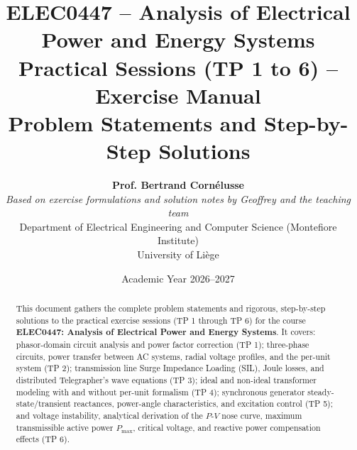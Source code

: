 \documentclass[11pt,a4paper]{article}
\title{
    \textbf{ELEC0447 -- Analysis of Electrical Power and Energy Systems} \\
    \vspace{0.4em}
    \Large Practical Sessions (TP 1 to 6) -- Exercise Manual \\
    \large Problem Statements and Step-by-Step Solutions
}
\author{
    \textbf{Prof. Bertrand Cornélusse} \\
    \textit{Based on exercise formulations and solution notes by Geoffrey and the teaching team} \\
    Department of Electrical Engineering and Computer Science (Montefiore Institute) \\
    University of Liège
}
\date{Academic Year 2026--2027}
\begin{document}
\maketitle

\begin{abstract}
This document gathers the complete problem statements and rigorous, step-by-step solutions to the practical exercise sessions (TP 1 through TP 6) for the course \textbf{ELEC0447: Analysis of Electrical Power and Energy Systems}. It covers: phasor-domain circuit analysis and power factor correction (TP 1); three-phase circuits, power transfer between AC systems, radial voltage profiles, and the per-unit system (TP 2); transmission line Surge Impedance Loading (SIL), Joule losses, and distributed Telegrapher's wave equations (TP 3); ideal and non-ideal transformer modeling with and without per-unit formalism (TP 4); synchronous generator steady-state/transient reactances, power-angle characteristics, and excitation control (TP 5); and voltage instability, analytical derivation of the $P$-$V$ nose curve, maximum transmissible active power $P_{\text{max}}$, critical voltage, and reactive power compensation effects (TP 6).
\end{abstract}

\vspace{1.5em}
\tableofcontents
\newpage


\newpage


\newpage


\newpage


\newpage


\newpage


\end{document}
